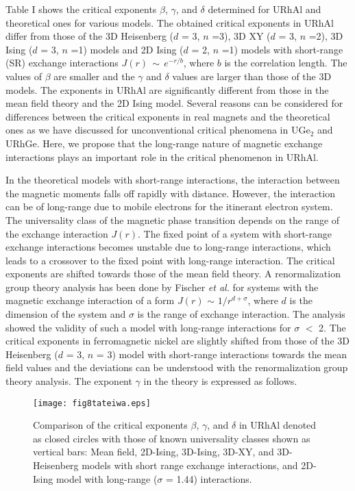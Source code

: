 \documentclass[twocolumn,showpacs,preprintnumbers,amsmath,amssymb]{revtex4}
\begin{document}
  Table I shows the critical exponents $\beta$, $\gamma$, and $\delta$ determined for URhAl and theoretical ones for various models\cite{privman,fischer1,guillou}. The obtained critical exponents in URhAl differ from those of the 3D Heisenberg ($d$ =  3, $n$ =3), 3D XY ($d$ =  3, $n$ =2), 3D Ising ($d$ =  3, $n$ =1) models and 2D Ising ($d$ =  2, $n$ =1) models with short-range (SR) exchange interactions $J(r){\,}{\sim}{\,}e^{-r/b}$, where $b$ is the correlation length. The values of $\beta$ are smaller and the $\gamma$ and $\delta$ values are larger than those of the 3D models. The exponents in URhAl are significantly different from those in the mean field theory and the 2D Ising model. Several reasons can be considered for differences between the critical exponents in real magnets and the theoretical ones as we have discussed for unconventional critical phenomena in UGe$_2$ and URhGe\cite{tateiwa1}. Here, we propose that the long-range nature of magnetic exchange interactions plays an important role in the critical phenomenon in URhAl. 
 
  In the theoretical models with short-range interactions, the interaction between the magnetic moments falls off rapidly with distance. However, the interaction can be of long-range due to mobile electrons for the itinerant electron system. The universality class of the magnetic phase transition depends on the range of the exchange interaction $J(r)$. The fixed point of a system with short-range exchange interactions becomes unstable due to long-range interactions, which leads to a crossover to the fixed point with long-range interaction. The critical exponents are shifted towards those of the mean field theory. A renormalization group theory analysis has been done by Fischer {\it et al.} for systems with the magnetic exchange interaction of a form $J(r)$ $\sim$ $1/r^{d+{\sigma}}$, where $d$ is the dimension of the system and $\sigma$ is the range of exchange interaction\cite{fischer2}. The analysis showed the validity of such a model with long-range interactions for $\sigma$ $<$ 2. The critical exponents in ferromagnetic nickel are slightly shifted from those of the 3D Heisenberg ($d$ =  3, $n$ = 3) model with short-range interactions towards the mean field values and the deviations can be understood with the renormalization group theory analysis\cite{seeger}. The exponent $\gamma$ in the theory is expressed as follows.
     \begin{figure}[]
\texttt{[image: fig8tateiwa.eps]}%
\caption{\label{fig:epsart}
Comparison of the critical exponents $\beta$, $\gamma$, and ${\delta}$ in URhAl denoted as closed circles with those of known universality classes shown as vertical bars: Mean field, 2D-Ising, 3D-Ising, 3D-XY, and 3D-Heisenberg models with short range exchange interactions, and 2D-Ising model with long-range ($\sigma$ = 1.44) interactions.}
\end{figure} 
\end{document}
